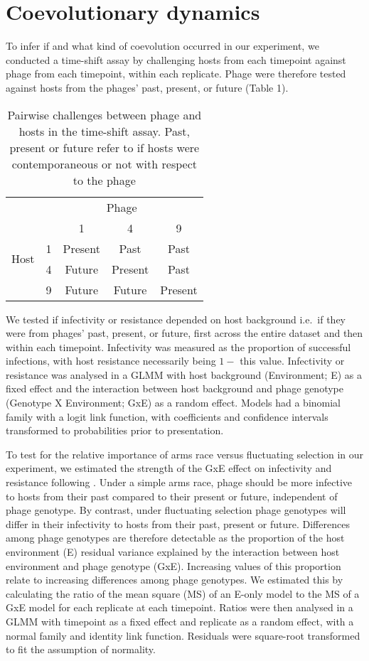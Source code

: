 \documentclass [12pt, a4paper, twoside]  {article}
\begin{document}
\section*{Coevolutionary dynamics}
To infer if and what kind of coevolution occurred in our experiment, we conducted a time-shift assay by challenging hosts from each timepoint against phage from each timepoint, within each replicate. Phage were therefore tested against hosts from the phages' past, present, or future (Table 1).

\begin{table}[!htb]
\centering
\begin{tabular}{c|c|c|c|c}
 	 & \multicolumn{4}{c}{Phage} \\\cline{2-5}
	\multirow{4}{*}{Host} & & 1 & 4 & 9 \\\hline
	& 1 & Present & Past & Past \\\cline{2-5}
	 & 4 & Future & Present & Past \\\cline{2-5}
	& 9 & Future & Future & Present \\

\end{tabular}
\caption{Pairwise challenges between phage and hosts in the time-shift assay. Past, present or future refer to if hosts were contemporaneous or not with respect to the phage}
\end{table}

We tested if infectivity or resistance depended on host background i.e.\ if they were from phages' past, present, or future, first across the entire dataset and then within each timepoint. Infectivity was measured as the proportion of successful infections, with host resistance necessarily being $1-$ this value. Infectivity or resistance was analysed in a GLMM with host background (Environment; E) as a fixed effect and the interaction between host background and phage genotype (Genotype X Environment; GxE) as a random effect. Models had a binomial family with a logit link function, with coefficients and confidence intervals transformed to probabilities prior to presentation.

To test for the relative importance of arms race versus fluctuating selection in our experiment, we estimated the strength of the GxE effect on infectivity and resistance following \cite{hall2011coevophage}. Under a simple arms race, phage should be more infective to hosts from their past compared to their present or future, independent of phage genotype. By contrast, under fluctuating selection phage genotypes will differ in their infectivity to hosts from their past, present or future. Differences among phage genotypes are therefore detectable as the proportion of the host environment (E) residual variance explained by the interaction between host environment and phage genotype (GxE). Increasing values of this proportion relate to increasing differences among phage genotypes. We estimated this by calculating the ratio of the mean square (MS) of an E-only model to the MS of a GxE model for each replicate at each timepoint. Ratios were then analysed in a GLMM with timepoint as a fixed effect and replicate as a random effect, with a normal family and identity link function. Residuals were square-root transformed to fit the assumption of normality. 

\clearpage

\end{document}
